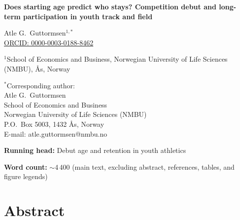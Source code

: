 \documentclass[12pt,a4paper]{article}
\begin{document}

\begin{titlepage}
\vspace*{2cm}

{\noindent\LARGE\bfseries Does starting age predict who stays? Competition debut and long-term participation in youth track and field\par}

\vspace{1.5cm}

{\noindent\large
Atle G.\ Guttormsen$^{1,*}$ \\
\href{https://orcid.org/0000-0003-0188-8462}{ORCID: 0000-0003-0188-8462}
}

\vspace{0.8cm}

{\noindent
$^1$School of Economics and Business, Norwegian University of Life Sciences (NMBU), Ås, Norway
}

\vspace{0.8cm}

{\noindent
$^*$Corresponding author:\\
Atle G.\ Guttormsen\\
School of Economics and Business\\
Norwegian University of Life Sciences (NMBU)\\
P.O.\ Box 5003, 1432 Ås, Norway\\
E-mail: atle.guttormsen@nmbu.no
}

\vspace{1.5cm}

{\noindent\textbf{Running head:} Debut age and retention in youth athletics}

\vspace{0.5cm}

{\noindent\textbf{Word count:} $\sim$4\,400 (main text, excluding abstract, references, tables, and figure legends)}

\end{titlepage}


\newpage
\section*{Abstract}
\end{document}
